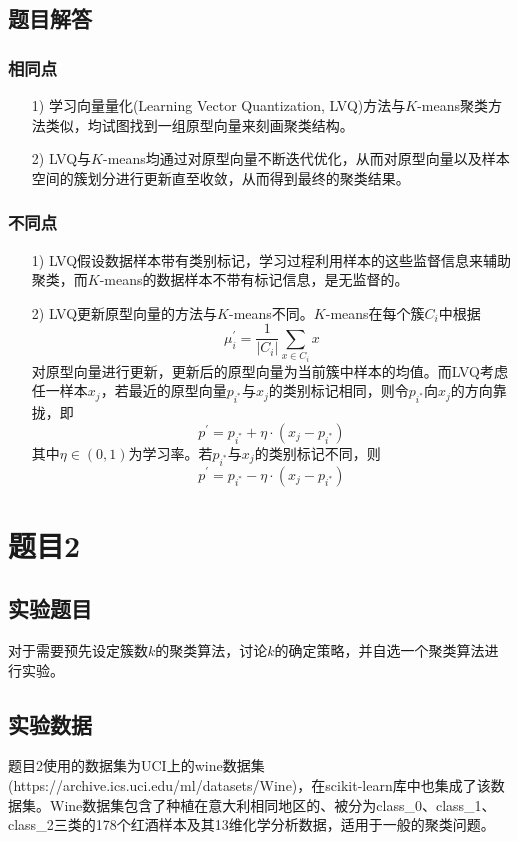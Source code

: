 \documentclass[12pt]{article}
\begin{document}
	\subsection{题目解答}
	\subsubsection{相同点}
	\begin{itemize}
		\item[1)]
		学习向量量化(Learning Vector Quantization, LVQ)方法与$K$-means聚类方法类似，均试图找到一组原型向量来刻画聚类结构。
		\item[2)] 
		LVQ与$K$-means均通过对原型向量不断迭代优化，从而对原型向量以及样本空间的簇划分进行更新直至收敛，从而得到最终的聚类结果。
	\end{itemize}
	
	\subsubsection{不同点}
	\begin{itemize}
		\item[1)]
		LVQ假设数据样本带有类别标记，学习过程利用样本的这些监督信息来辅助聚类，而$K$-means的数据样本不带有标记信息，是无监督的。
		\item[2)] 
		LVQ更新原型向量的方法与$K$-means不同。$K$-means在每个簇$C_{i}$中根据
		$$
		\mu^{\prime}_{i}=\frac{1}{|C_{i}|}\sum_{x\in C_{i}}x
		$$
		对原型向量进行更新，更新后的原型向量为当前簇中样本的均值。而LVQ考虑任一样本$x_{j}$，若最近的原型向量$p_{i^{*}}$与$x_{j}$的类别标记相同，则令$p_{i^{*}}$向$x_{j}$的方向靠拢，即
		$$
		p^{\prime}=p_{i^{*}}+\eta \cdot (x_{j}-p_{i^{*}})
		$$
		其中$\eta\in (0,1)$为学习率。若$p_{i^{*}}$与$x_{j}$的类别标记不同，则
		$$
		p^{\prime}=p_{i^{*}}-\eta \cdot (x_{j}-p_{i^{*}})
		$$
	\end{itemize}




\newpage
\section{题目2}
\subsection{实验题目}
对于需要预先设定簇数$k$的聚类算法，讨论$k$的确定策略，并自选一个聚类算法进行实验。
\vbox{}
\subsection{实验数据}
题目2使用的数据集为UCI上的wine数据集(https://archive.ics.uci.edu/ml/datasets/Wine)，在scikit-learn库中也集成了该数据集。Wine数据集包含了种植在意大利相同地区的、被分为class\_0、class\_1、class\_2三类的178个红酒样本及其13维化学分析数据，适用于一般的聚类问题。
\end{document}
